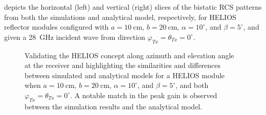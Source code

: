  depicts the horizontal (left) and vertical (right) slices of the bistatic RCS patterns from both the simulations and analytical model, respectively, for HELIOS reflector modules configured with $a=\SI{10}{\centi\meter}$, $b=\SI{20}{\centi\meter}$, $\alpha=\num{10}^\circ$, and $\beta=\num{5}^\circ$, and given a \SI{28}{\giga\hertz} incident wave from direction $\varphi_{Tx}=\theta_{Tx}=\num{0}^\circ$.
\begin{figure}[tb]
	\centering
	\hfill
	\caption[Validating the HELIOS concept along azimuth and elevation angle at the receiver and highlighting the similarities and differences between simulated and analytical models for a HELIOS module when $a=\SI{10}{\centi\meter}$, $b=\SI{20}{\centi\meter}$, $\alpha=\num{10}^\circ$, and $\beta=\num{5}^\circ$, and both $\varphi_{Tx}=\theta_{Tx}=\num{0}^\circ$. A notable match in the peak gain is observed between the simulation results and the analytical model.]{Validating the HELIOS concept along azimuth and elevation angle at the receiver and highlighting the similarities and differences between simulated and analytical models for a HELIOS module when $a=\SI{10}{\centi\meter}$, $b=\SI{20}{\centi\meter}$, $\alpha=\num{10}^\circ$, and $\beta=\num{5}^\circ$, and both $\varphi_{Tx}=\theta_{Tx}=\num{0}^\circ$. A notable match in the peak gain is observed between the simulation results and the analytical model.}
	\label{fig:comparison1d}
\end{figure}
